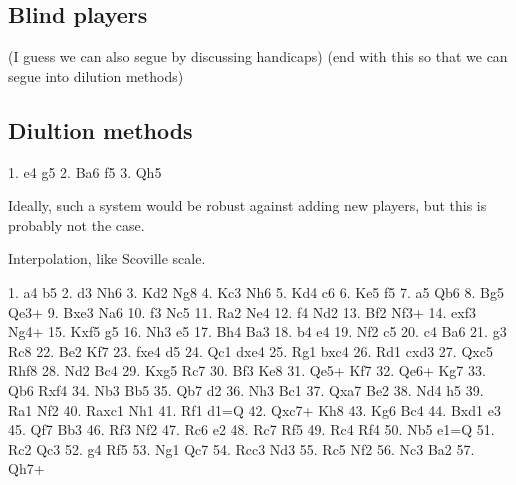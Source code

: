 \documentclass[10pt,preprint,twocolumn]{acmart}
\begin{document}
 \deterministic

\subsection{Blind players}


(I guess we can also segue by discussing handicaps)
(end with this so that we can segue into dilution methods)

\subsection{Diultion methods}
1. e4 g5 2. Ba6 f5 3. Qh5



Ideally, such a system would be robust against adding new players,
but this is probably not the case.


% 

Interpolation, like Scoville scale.


1. a4 b5 2. d3 Nh6 3. Kd2 Ng8 4. Kc3 Nh6
5. Kd4 c6 6. Ke5 f5 7. a5 Qb6 8. Bg5 Qe3+
9. Bxe3 Na6 10. f3 Nc5 11. Ra2 Ne4 12. f4 Nd2
13. Bf2 Nf3+ 14. exf3 Ng4+ 15. Kxf5 g5 16. Nh3 e5
17. Bh4 Ba3 18. b4 e4 19. Nf2 c5 20. c4 Ba6
21. g3 Rc8 22. Be2 Kf7 23. fxe4 d5 24. Qc1 dxe4
25. Rg1 bxc4 26. Rd1 cxd3 27. Qxc5 Rhf8 28. Nd2 Bc4
29. Kxg5 Rc7 30. Bf3 Ke8 31. Qe5+ Kf7 32. Qe6+ Kg7
33. Qb6 Rxf4 34. Nb3 Bb5 35. Qb7 d2 36. Nh3 Bc1
37. Qxa7 Be2 38. Nd4 h5 39. Ra1 Nf2 40. Raxc1 Nh1
41. Rf1 d1=Q 42. Qxc7+ Kh8 43. Kg6 Bc4 44. Bxd1 e3
45. Qf7 Bb3 46. Rf3 Nf2 47. Rc6 e2 48. Rc7 Rf5
49. Rc4 Rf4 50. Nb5 e1=Q 51. Rc2 Qc3 52. g4 Rf5
53. Ng1 Qc7 54. Rcc3 Nd3 55. Rc5 Nf2 56. Nc3 Ba2
57. Qh7+
\end{document}
